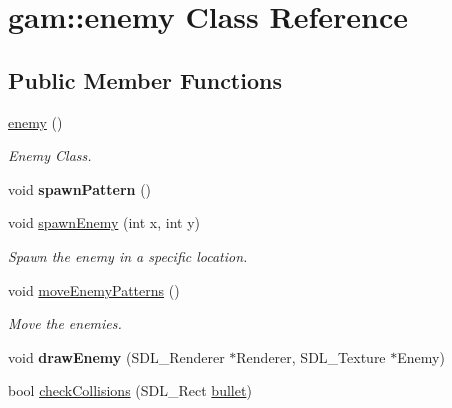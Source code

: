 \hypertarget{classgam_1_1enemy}{\section{gam\+:\+:enemy Class Reference}
\label{classgam_1_1enemy}
}
\subsection*{Public Member Functions}
\begin{DoxyCompactItemize}
\item 
\hyperlink{classgam_1_1enemy_a0b096526b359efd64a3f190a9b4c83e0}{enemy} ()
\begin{DoxyCompactList}\small\item\em Enemy Class. \end{DoxyCompactList}\item 
\hypertarget{classgam_1_1enemy_a84002000744fc519460216242419e8e5}{void {\bfseries spawn\+Pattern} ()}\label{classgam_1_1enemy_a84002000744fc519460216242419e8e5}

\item 
void \hyperlink{classgam_1_1enemy_a4a2637eebd069e9a82173d2b8bbb3c4e}{spawn\+Enemy} (int x, int y)
\begin{DoxyCompactList}\small\item\em Spawn the enemy in a specific location. \end{DoxyCompactList}\item 
\hypertarget{classgam_1_1enemy_acc1da54f010311fcac178e2075fd161d}{void \hyperlink{classgam_1_1enemy_acc1da54f010311fcac178e2075fd161d}{move\+Enemy\+Patterns} ()}\label{classgam_1_1enemy_acc1da54f010311fcac178e2075fd161d}

\begin{DoxyCompactList}\small\item\em Move the enemies. \end{DoxyCompactList}\item 
\hypertarget{classgam_1_1enemy_af9b44449018ce7aa116568741718717c}{void {\bfseries draw\+Enemy} (S\+D\+L\+\_\+\+Renderer $\ast$Renderer, S\+D\+L\+\_\+\+Texture $\ast$Enemy)}\label{classgam_1_1enemy_af9b44449018ce7aa116568741718717c}

\item 
\hypertarget{classgam_1_1enemy_a1e8f7ae8451d4fbf625dab35811a013d}{bool \hyperlink{classgam_1_1enemy_a1e8f7ae8451d4fbf625dab35811a013d}{check\+Collisions} (S\+D\+L\+\_\+\+Rect \hyperlink{classgam_1_1bullet}{bullet})}\label{classgam_1_1enemy_a1e8f7ae8451d4fbf625dab35811a013d}


\end{DoxyCompactItemize}
